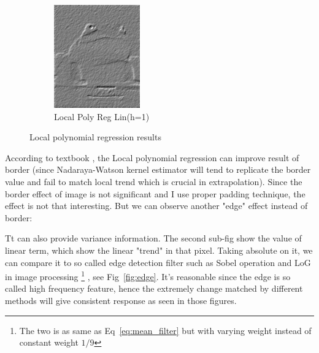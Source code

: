 \documentclass{article}
\begin{document}
\begin{figure}[htb]
\begin{subfigure}[b]{0.24\linewidth}
    \includegraphics[width=\linewidth]{images/poly_nr_lin_true.png}
    \caption{Local Poly Reg Lin(h=1)}
  \end{subfigure}
  \caption{Local polynomial regression results}
  \label{fig:local_poly}
\end{figure}


According to textbook \cite{wasserman2006all}, the Local polynomial regression can improve result of border
(since Nadaraya-Watson kernel estimator will tend to replicate the border value 
and fail to match local trend which is crucial in extrapolation).
Since the border effect of image is not significant and I use proper padding technique, the effect is not that interesting.
But we can observe another "edge" effect instead of border: 

Tt can also provide variance information. The second sub-fig show the value of linear term, 
which show the linear "trend" in that pixel. 
Taking absolute on it, we can compare it to so called edge detection filter such as Sobel operation and LoG
in image processing 
\footnote{The two is as same as Eq~\ref{eq:mean_filter} but with varying weight instead of constant weight $1/9$}
, see Fig~\ref{fig:edge}. It's reasonable since the edge is so called high frequency feature, hence the extremely
change matched by different methods will give consistent response as seen in those figures.
\end{document}
